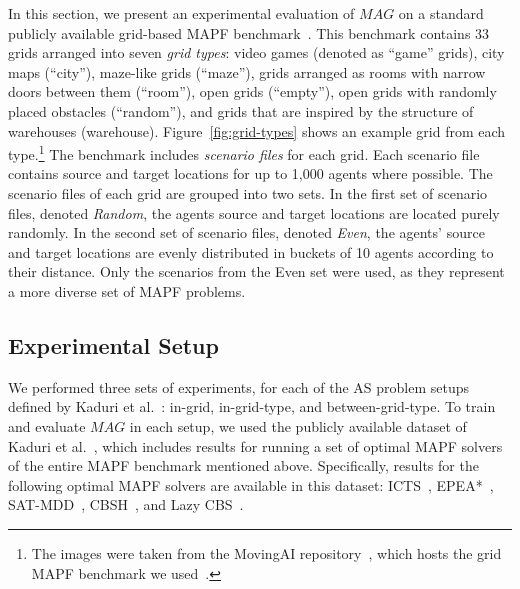 \documentclass{ecai}
\newcommand{\Carmel}[1]{}
\newcommand{\Roni}[1]{}
\newcommand{\shortcite}[1]{\cite{#1}}
\newcommand{\mapfgas}[1]{\ensuremath{\textit{MAG}}\xspace}
\begin{document}
In this section, we present an experimental evaluation of \mapfgas\ on a standard publicly available grid-based MAPF benchmark~\cite{stern2019multi}. 
This benchmark contains 33 grids arranged into seven \emph{grid types}: video
games (denoted as ``game'' grids), city maps (``city''), maze-like
grids (``maze''), grids arranged as rooms with narrow doors
between them (``room''), open grids (``empty''), open grids with
randomly placed obstacles (``random''), and grids that are inspired by the structure of warehouses (warehouse).
Figure~\ref{fig:grid-types} shows an example grid from each type.\footnote{The images were taken from the MovingAI repository~\cite{sturtevant2012benchmarks}, which hosts the grid MAPF benchmark we used~\cite{stern2019multi}.}
The benchmark includes \emph{scenario files} for each grid. 
Each scenario file contains source and target locations for up to 1,000 agents where possible. 
The scenario files of each grid are grouped into two sets. 
In the first set of scenario files, denoted
\emph{Random}, 
the agents source and target locations are located
purely randomly. 
In the second set of scenario files, denoted
\emph{Even}, the agents’ source and target locations are evenly distributed in buckets of 10 agents according to their distance. 
Only the scenarios from the Even set were used, as they represent a more diverse set of MAPF problems. 

\subsection{Experimental Setup}

We performed three sets of experiments, 
for each of the AS problem setups defined by Kaduri et al.~\cite{kaduri2021experimental}: in-grid, in-grid-type, and between-grid-type. 
To train and evaluate \mapfgas\ in each setup, we used the publicly available dataset of Kaduri et al.~\shortcite{kaduri2021experimental}, 
which includes results for running a set of optimal MAPF solvers of the entire MAPF benchmark mentioned above. 
Specifically, results for the following optimal MAPF solvers are available in this dataset: ICTS~\cite{sharon2013increasing}, EPEA*~\cite{goldenberg2014enhanced}, SAT-MDD~\cite{surynek2016efficient}, CBSH~\cite{felner2018adding}, and Lazy CBS~\cite{gange2019lazy}. 
\end{document}
